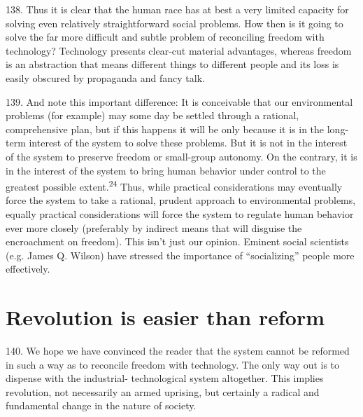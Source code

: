 \documentclass{article}
\begin{document}
138.  Thus  it  is  clear  that  the  human  race  has  at  best  a  very  limited  capacity  for  solving  even  
relatively straightforward social problems.  How then is it going to solve the far more difficult and 
subtle problem of reconciling freedom with technology? Technology presents clear-cut material 
advantages, whereas freedom is an abstraction that means different things to different people and 
its loss is easily obscured by propaganda and fancy talk. \vspace{\baselineskip}

139.  And note this important difference: It is conceivable that our environmental problems (for 
example) may some day be settled through a rational, comprehensive plan, but if this happens it 
will be only because it is in the long-term interest of the system to solve these problems.  But it is 
not in the interest of the system to preserve freedom or small-group autonomy.  On the contrary, 
it is in the interest of the system to bring human  behavior under control to the greatest possible 
extent.\textsuperscript{24} Thus, while practical considerations may eventually force the system to take a rational, 
prudent  approach  to  environmental  problems,  equally  practical  considerations  will  force  the  
system  to  regulate  human  behavior  ever  more  closely  (preferably  by  indirect  means  that  will  
disguise  the  encroachment  on  freedom).   This  isn’t  just  our  opinion.   Eminent  social  scientists  
(e.g.  James Q.  Wilson) have stressed the importance of “socializing” people more effectively. 


\section{Revolution is easier than reform}

\hspace{0.5cm} 140.  We hope we have convinced the reader that the system cannot be reformed in such a way as 
to  reconcile  freedom  with  technology.   The  only  way  out  is  to  dispense  with  the  industrial-
technological system altogether.  This implies revolution, not necessarily an armed uprising, but 
certainly a radical and fundamental change in the nature of society. \vspace{\baselineskip} 
\end{document}
